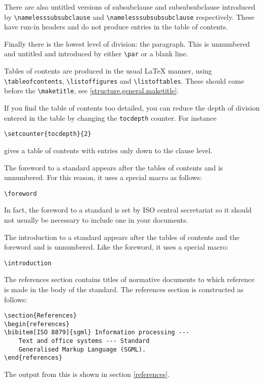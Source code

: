 There are also untitled versions of subsubclause and subsubsubclause
introduced by \verb|\namelesssubsubclause| and \verb|\namelesssubsubsubclause|
respectively.
These have run-in headers and do not produce entries in the table of
contents.

Finally there is the lowest level of division: the paragraph.
This is unnumbered and untitled and introduced by either \verb|\par|
or a blank line.

\label{contents}
Tables of contents are produced in the usual LaTeX manner, using
\verb|\tableofcontents|, \verb|\listoffigures| and
\verb|\listoftables|.
These should come before the \verb|\maketitle|, see
\ref{structure.general.maketitle}.
\begin{note}
If you find the table of contents too detailed, you can reduce the depth
of division entered in the table by changing the \verb|tocdepth| counter.
For instance
\begin{verbatim}
\setcounter{tocdepth}{2}
\end{verbatim}
gives a table of contents with entries only down to the clause level.
\end{note}

\label{special.foreword}
The foreword to a standard appears after the tables of contents and is
unnumbered.
For this reason, it uses a special macro as follows:
\begin{verbatim}
\foreword
\end{verbatim}
In fact, the foreword to a standard is set by ISO central secretariat so
it should not usually be necessary to include one in your documents.

\label{special.intro}
The introduction to a standard appears after the tables of contents and the
foreword and is unnumbered.
Like the foreword, it uses a special macro:
\begin{verbatim}
\introduction
\end{verbatim}

The references section contains titles of normative documents to which
reference is made in the body of the standard.
The references section is constructed as follows:
\begin{verbatim}
\section{References}
\begin{references}
\bibitem[ISO 8879]{sgml} Information processing ---
    Text and office systems --- Standard
    Generalised Markup Language (SGML).
\end{references}
\end{verbatim}
The output from this is shown in section \ref{references}.

